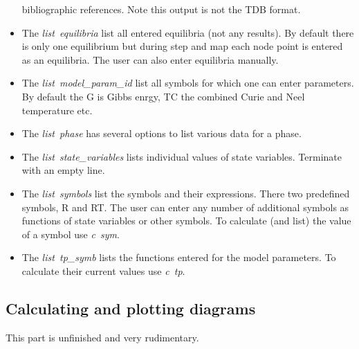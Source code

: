\documentclass[12pt]{article}
\begin{document}
\begin{itemize}
  bibliographic references.  Note this output is not the TDB format.
\item The {\em list~equilibria} list all entered equilibria (not
  any results).  By default there is only one equilibrium but during step
  and map each node point is entered as an equilibria.  The user can
  also enter equilibria manually.
\item The {\em list~model\_param\_id} list all symbols for which one
  can enter parameters.  By default the G is Gibbs enrgy, TC the
  combined Curie and Neel temperature etc.
\item The {\em list~phase} has several options to list various data
  for a phase.
\item The {\em list~state\_variables} lists individual values of state
  variables.  Terminate with an empty line.
\item The {\em list~symbols} list the symbols and their expressions.
  There two predefined symbols, R and RT.  The user can enter any
  number of additional symbols as functions of state variables or
  other symbols.  To calculate (and list) the value of a symbol use
  {\em c~sym}.
\item The {\em list~tp\_symb} lists the functions entered for the
  model parameters.  To calculate their current values use {\em c~tp}.
\end{itemize}

\subsection{Calculating and plotting diagrams}

This part is unfinished and very rudimentary.
\end{document}
